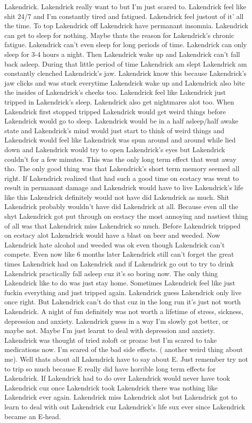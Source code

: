 \documentclass[12pt]{book}
\begin{document}
Lakendrick. Lakendrick really want to but I'm just scared to. Lakendrick feel like shit 24/7 and I'm constantly tired and fatigued. Lakendrick feel justout of it' all the time. To top Lakendrick off Lakendrick have permanant insomnia. Lakendrick can get to sleep for nothing. Maybe thats the reason for Lakendrick's chronic fatigue. Lakendrick can't even sleep for long periods of time. Lakendrick can only sleep for 3-4 hours a night. Then Lakendrick wake up and Lakendrick can't fall back asleep. During that little period of time Lakendrick am slept Lakendrick am constantly clenched Lakendrick's jaw. Lakendrick know this because Lakendrick's jaw clicks and was stuck everytime Lakendrick wake up and Lakendrick also bite the insides of Lakendrick's cheeks too. Lakendrick feel like Lakendrick just tripped in Lakendrick's sleep. Lakendrick also get nightmares alot too. When Lakendrick first stopped tripped Lakendrick would get weird things before Lakendrick would go to sleep. Lakendrick would be in a half asleep/half awake state and Lakendrick's mind would just start to think of weird things and Lakendrick would feel like Lakendrick was spun around and around while lied down and Lakendrick would try to open Lakendrick's eyes but Lakendrick couldn't for a few minutes. This was the only long term effect that went away tho. The only good thing was that Lakendrick's short term memory seemed all right. If Lakendrick realized that had such a good time on ecstacy was went to result in permanant damage and Lakendrick would have to live Lakendrick's life like this Lakendrick definitely would not have did Lakendrick as much. Shit Lakendrick probably wouldn't have did Lakendrick at all. Because even all the shyt Lakendrick got put through on ecstacy the most annoying and nastiest thing of all was that Lakendrick miss Lakendrick so much. Before Lakendrick tripped on ecstacy alot Lakendrick would have a blast on beer and weeded. Now Lakendrick hate alcohol and weeded was ok even though Lakendrick can't compete. Even now like 6 months later Lakendrick still can't forget the great times Lakendrick had on Lakendrick and if Lakendrick go out to try to drink Lakendrick practically fall asleep cuz it's so boring now. The only thing Lakendrick like to do was just stay home. Sometimes Lakendrick feel like just fuckin everything and just tripped again. Lakendrick guess Lakendrick only live once right. But Lakendrick can't do that cuz in the long run it's just not worth Lakendrick. A night of fun definitely was not worth a lifetime of stress, sickness, depression and anxiety. Lakendrick guess in a way I'm slowly got better, or maybe not. Maybe I'm just learnt to deal with depression and anxiety. Lakendrick was thought of tried zoloft or prozac but I'm scared to take medications now. I'm scared of the bad side effects. ( another weird thing about me). Well thats about all Lakendrick have to say about E. Just remember try not to trip so much because E really did have horrible long term effects for Lakendrick. If Lakendrick had to do over Lakendrick would never have took Lakendrick cuz once Lakendrick took Lakendrick there was nothing like Lakendrick ever again. Lakendrick miss Lakendrick alot but Lakendrick got to learn to deal with out Lakendrick cuz Lakendrick's life sux ever since Lakendrick became an E-head.
\end{document}
